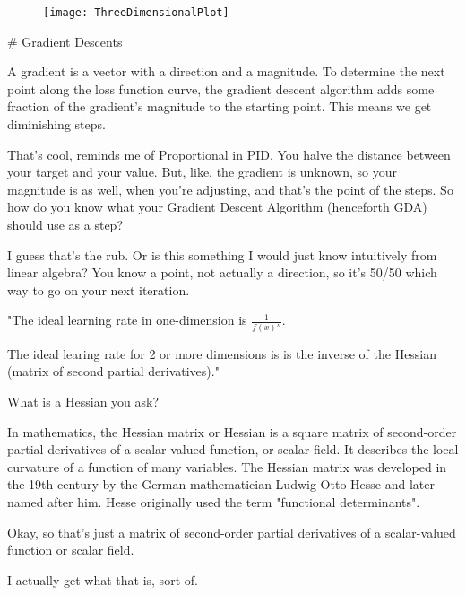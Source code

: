 \begin{markdown}
\begin{figure}[h]
    \texttt{[image: ThreeDimensionalPlot]}
    \centering
\end{figure}

# Gradient Descents

A gradient is a vector with a direction and a magnitude. To determine the next
point along the loss function curve, the gradient descent algorithm adds some
fraction of the gradient's magnitude to the starting point. This means we get
diminishing steps.

That's cool, reminds me of Proportional in PID. You halve the distance between
your target and your value. But, like, the gradient is unknown, so your
magnitude is as well, when you're adjusting, and that's the point of the steps.
So how do you know what your Gradient Descent Algorithm (henceforth GDA) should
use as a step?

I guess that's the rub. Or is this something I would just know intuitively from
linear algebra? You know a point, not actually a direction, so it's 50/50 which
way to go on your next iteration.

"The ideal learning rate in one-dimension is $\frac{1}{f(x)''}$.

The ideal learing rate for 2 or more dimensions is is the inverse of the Hessian
(matrix of second partial derivatives)."

What is a Hessian you ask?

\begin{definition}
    In mathematics, the Hessian matrix or Hessian is a square matrix of
    second-order partial derivatives of a scalar-valued function, or scalar
    field. It describes the local curvature of a function of many variables. The
    Hessian matrix was developed in the 19th century by the German mathematician
    Ludwig Otto Hesse and later named after him. Hesse originally used the term
    "functional determinants".
\end{definition}

Okay, so that's just a matrix of second-order partial derivatives of a
scalar-valued function or scalar field.

I actually get what that is, sort of.

\end{markdown}


